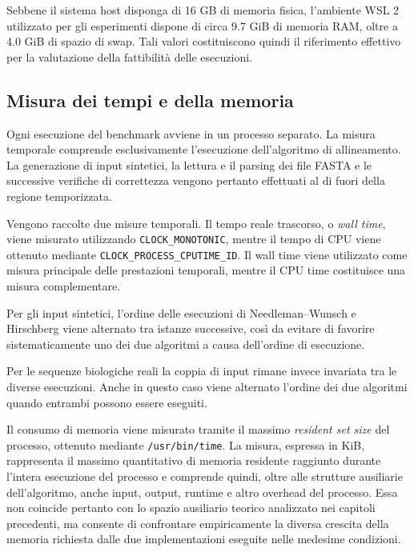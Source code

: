 Sebbene il sistema host disponga di 16 GB di memoria fisica, l'ambiente WSL 2 utilizzato per gli esperimenti dispone di circa 9.7 GiB di memoria RAM,
oltre a 4.0 GiB di spazio di swap. Tali valori costituiscono quindi il riferimento effettivo per la valutazione della fattibilità delle esecuzioni.

\clearpage
\enlargethispage{3\baselineskip}
\subsection{Misura dei tempi e della memoria}
\label{sec:misura}

Ogni esecuzione del benchmark avviene in un processo separato.
La misura temporale comprende esclusivamente l'esecuzione dell'algoritmo di allineamento. La generazione di input sintetici, la lettura
e il parsing dei file FASTA e le successive verifiche di correttezza vengono pertanto effettuati al di fuori della regione temporizzata.

Vengono raccolte due misure temporali. Il tempo reale trascorso, o \emph{wall time}, viene misurato utilizzando \texttt{CLOCK\_MONOTONIC},
mentre il tempo di CPU viene ottenuto mediante \texttt{CLOCK\_PROCESS\_CPUTIME\_ID}. Il wall time viene utilizzato come misura principale delle prestazioni
temporali, mentre il CPU time costituisce una misura complementare.

Per gli input sintetici, l'ordine delle esecuzioni di Needleman--Wunsch e Hirschberg viene alternato tra istanze successive, così da evitare
di favorire sistematicamente uno dei due algoritmi a causa dell'ordine di esecuzione.

Per le sequenze biologiche reali la coppia di input rimane invece invariata tra le diverse esecuzioni. Anche in questo caso viene alternato
l'ordine dei due algoritmi quando entrambi possono essere eseguiti.

Il consumo di memoria viene misurato tramite il massimo \emph{resident set size} del processo, ottenuto mediante \texttt{/usr/bin/time}.
La misura, espressa in KiB, rappresenta il massimo quantitativo di memoria residente raggiunto durante l'intera esecuzione del processo
e comprende quindi, oltre alle strutture ausiliarie dell'algoritmo, anche input, output, runtime e altro overhead del processo.
Essa non coincide pertanto con lo spazio ausiliario teorico analizzato nei capitoli precedenti, ma consente di confrontare empiricamente
la diversa crescita della memoria richiesta dalle due implementazioni eseguite nelle medesime condizioni.

